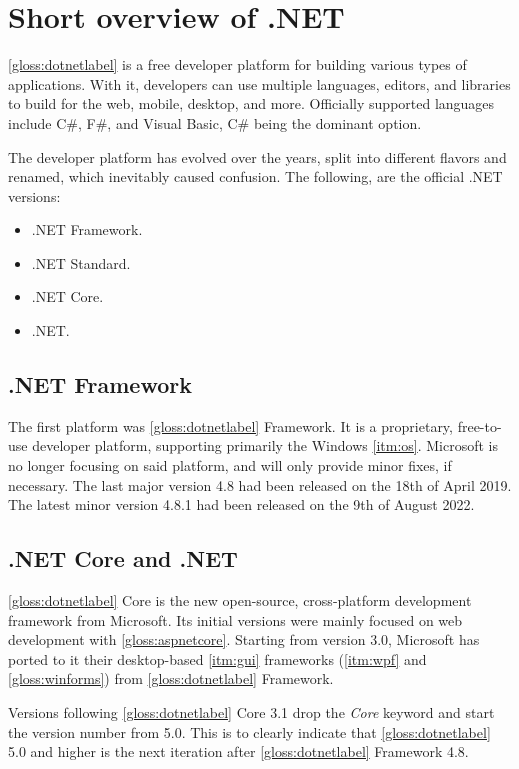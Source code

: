 \chapter{Short overview of .NET} \label{chap:overviewNET}
\ref{gloss:dotnetlabel} is a free developer platform for building various types of applications. With it, developers can use multiple languages, editors, and libraries to build for the web, mobile, desktop, and more.
Officially supported languages include C\#, F\#, and Visual Basic, C\# being the dominant option.

The developer platform has evolved over the years, split into different flavors and renamed, which inevitably caused confusion.
The following, are the official .NET versions:
\begin{itemize}
    \item .NET Framework.
    \item .NET Standard.
    \item .NET Core.
    \item .NET.
\end{itemize}

\section{.NET Framework} \label{sec:netFramework}

The first platform was \ref{gloss:dotnetlabel} Framework. It is a proprietary, free-to-use developer platform, supporting primarily the Windows \ref{itm:os}. Microsoft is no longer focusing on said platform, and will only provide minor fixes, if necessary. The last major version 4.8 had been released on the 18th of April 2019. The latest minor version 4.8.1 had been released on the 9th of August 2022.

\section{.NET Core and .NET} \label{sec:netCore}

\ref{gloss:dotnetlabel} Core is the new open-source, cross-platform development framework from Microsoft. Its initial versions were mainly focused on web development with \ref{gloss:aspnetcore}. Starting from version 3.0, Microsoft has ported to it their desktop-based \ref{itm:gui} frameworks (\ref{itm:wpf} and \ref{gloss:winforms}) from \ref{gloss:dotnetlabel} Framework.

Versions following \ref{gloss:dotnetlabel} Core 3.1 drop the \textit{Core} keyword and start the version number from 5.0. This is to clearly indicate that \ref{gloss:dotnetlabel} 5.0 and higher is the next iteration after \ref{gloss:dotnetlabel} Framework 4.8.

